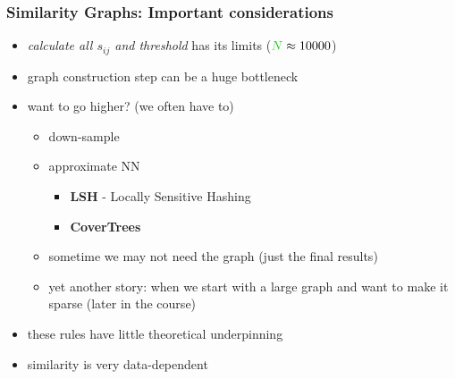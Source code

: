 \documentclass{beamer}
\begin{document}
\begin{frame}
\frametitle{Similarity Graphs: Important considerations}

\begin{itemize}[<+-| alert@+>]%
\item \emph{calculate all $s_{ij}$ and threshold} has its limits ($\nodes \approx 10000$)  
\item graph construction step can be a huge bottleneck
\item want to go higher? (we often have to)
\begin{itemize}
\item down-sample
\item approximate NN 
\begin{itemize}
\item \textbf{LSH} - Locally Sensitive Hashing
\item \textbf{CoverTrees} 
\end{itemize}
\item sometime we may not need the graph (just the final results)
\item yet another story: when we start with a large graph and want to make it sparse (later in the course)
\end{itemize}
\item these rules have little theoretical underpinning 
\item similarity is very data-dependent 
\end{itemize}
\end{frame}

\MakeLastSlide
\end{document}
